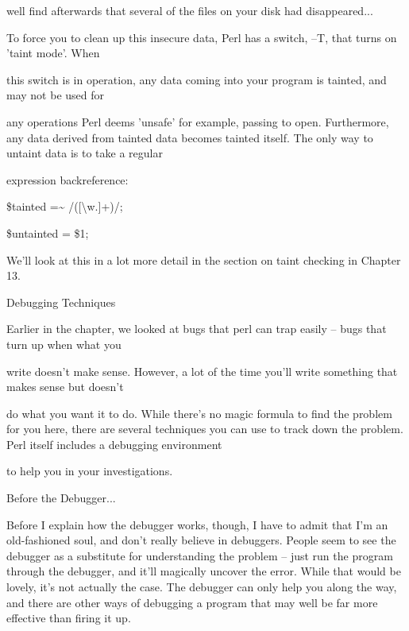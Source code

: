 \documentclass[a4paper,11pt]{book}
\begin{document}
\noindent well find afterwards that several of the files on your disk had disappeared...

\noindent 

\noindent 

\noindent To  force you  to  clean up this insecure  data,  Perl  has  a  switch,  --T,  that  turns  on  'taint  mode'.  When

\noindent this switch  is in operation,  any  data  coming  into  your  program  is  tainted,  and may  not be  used for

\noindent any operations Perl deems 'unsafe' for  example,  passing  to  open.  Furthermore,  any  data  derived  from tainted data becomes tainted itself.  The  only  way  to  untaint  data  is  to  take a  regular

\noindent expression backreference:

\noindent 

\noindent \$tainted =\~{} /([\textbackslash w.]+)/;

\noindent \$untainted = \$1;

\noindent 

\noindent We'll look at this in a lot more detail in the section on taint checking in Chapter 13.

\noindent 

\noindent 

\noindent Debugging Techniques

\noindent 

\noindent Earlier in the chapter, we looked at bugs that perl can trap easily -- bugs that turn up when what you

\noindent write doesn't make sense. However, a lot of the time you'll write something that makes sense but doesn't

\noindent do what you want it to do. While there's no magic formula to find the problem for you here, there are several techniques you can use to track down the problem. Perl itself includes a debugging environment

\noindent to help you in your investigations.

\noindent 

\noindent Before the Debugger...

\noindent Before I explain how the debugger works, though, I have to admit that I'm an old-fashioned soul, and don't really believe in debuggers. People seem to see the debugger as a substitute for understanding the problem -- just run the program through the debugger, and it'll magically uncover the error. While that would be lovely, it's not actually the case. The debugger can only help you along the way, and there are other ways of debugging a program that may well be far more effective than firing it up.
\end{document}
